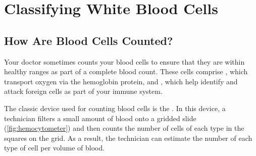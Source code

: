 \chapter[Classifying White Blood Cells]{Classifying White Blood Cells}
\label{chapter:white_blood_cells}
\renewcommand{\chaptertitle}{Classifying White Blood Cells}


\FloatBarrier

\section{How Are Blood Cells Counted?}
\label{sec:introduction}

Your doctor sometimes counts your blood cells to ensure that they are within healthy ranges as part of a complete blood count. These cells comprise , which transport oxygen via the hemoglobin protein, and , which help identify and attack foreign cells as part of your immune system.

The classic device used for counting blood cells is the . In this device, a technician filters a small amount of blood onto a gridded slide (\autoref{fig:hemocytometer}) and then counts the number of cells of each type in the squares on the grid. As a result, the technician can estimate the number of each type of cell per volume of blood.\\

